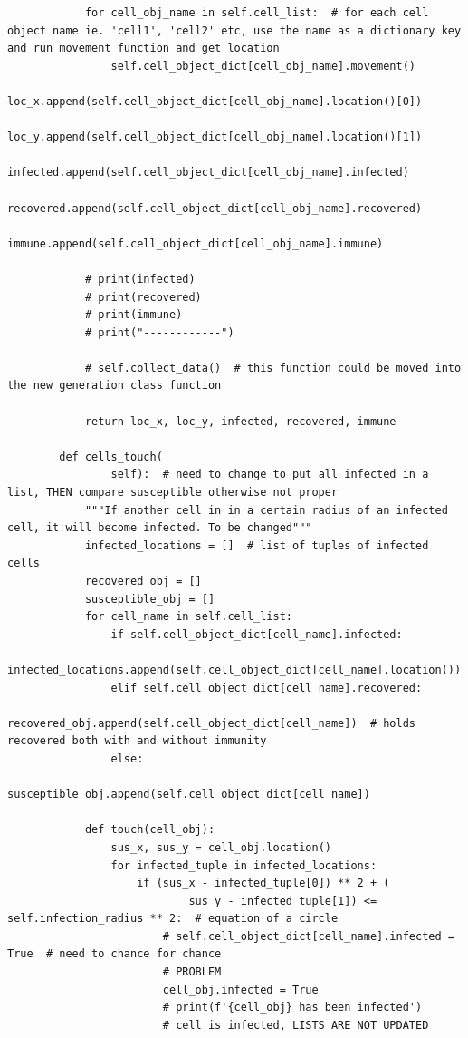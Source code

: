 \documentclass[11pt, a4paper]{article}
\begin{document}
\begin{lstlisting}
            for cell_obj_name in self.cell_list:  # for each cell object name ie. 'cell1', 'cell2' etc, use the name as a dictionary key and run movement function and get location
                self.cell_object_dict[cell_obj_name].movement()
                loc_x.append(self.cell_object_dict[cell_obj_name].location()[0])
                loc_y.append(self.cell_object_dict[cell_obj_name].location()[1])
                infected.append(self.cell_object_dict[cell_obj_name].infected)
                recovered.append(self.cell_object_dict[cell_obj_name].recovered)
                immune.append(self.cell_object_dict[cell_obj_name].immune)
    
            # print(infected)
            # print(recovered)
            # print(immune)
            # print("------------")
    
            # self.collect_data()  # this function could be moved into the new generation class function
    
            return loc_x, loc_y, infected, recovered, immune
    
        def cells_touch(
                self):  # need to change to put all infected in a list, THEN compare susceptible otherwise not proper
            """If another cell in in a certain radius of an infected cell, it will become infected. To be changed"""
            infected_locations = []  # list of tuples of infected cells
            recovered_obj = []
            susceptible_obj = []
            for cell_name in self.cell_list:
                if self.cell_object_dict[cell_name].infected:
                    infected_locations.append(self.cell_object_dict[cell_name].location())
                elif self.cell_object_dict[cell_name].recovered:
                    recovered_obj.append(self.cell_object_dict[cell_name])  # holds recovered both with and without immunity
                else:
                    susceptible_obj.append(self.cell_object_dict[cell_name])
    
            def touch(cell_obj):
                sus_x, sus_y = cell_obj.location()
                for infected_tuple in infected_locations:
                    if (sus_x - infected_tuple[0]) ** 2 + (
                            sus_y - infected_tuple[1]) <= self.infection_radius ** 2:  # equation of a circle
                        # self.cell_object_dict[cell_name].infected = True  # need to chance for chance
                        # PROBLEM
                        cell_obj.infected = True
                        # print(f'{cell_obj} has been infected')
                        # cell is infected, LISTS ARE NOT UPDATED
    

\end{lstlisting}
\end{document}
